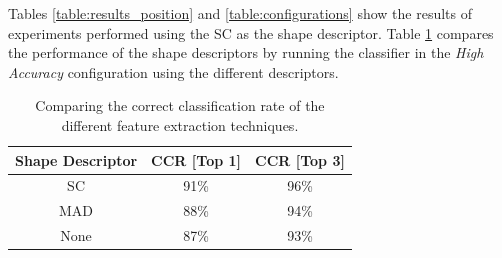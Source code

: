 Tables \ref{table:results_position} and \ref{table:configurations} show the results of experiments performed using the SC as the shape descriptor.
Table \ref{table:features_comparison} compares the performance of the shape descriptors by running the classifier in the \emph{High Accuracy} configuration using the different descriptors.

\begin{table}
\centering
\renewcommand{\arraystretch}{1.2}
\begin{tabular}{ | c | c | c |}
\hline
	\textbf{Shape Descriptor}  & \textbf{CCR [Top 1]}  & \textbf{CCR [Top 3]} \\
	\hline 
	SC      & 91\% & 96\%  \\                
  	\hline
  	MAD     & 88\% & 94\% \\
  	\hline
  	None    & 87\% & 93\% \\
  	\hline
\end{tabular}
\caption{Comparing the correct classification rate of the different feature extraction techniques.}
\label{table:features_comparison} 
\end{table}

%
%
%
